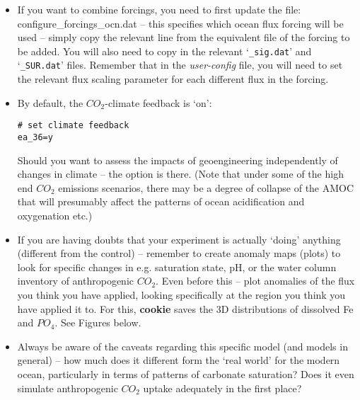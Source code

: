 \begin{itemize}

\vspace{1mm}
\item If you want to combine forcings, you need to first update the file: \textsf{\footnotesize configure\_forcings\_ocn.dat} – this specifies which ocean flux forcing will be used – simply copy the relevant line from the equivalent file of the forcing to be added. You will also need to copy in the relevant ‘\texttt{\_sig.dat}’ and ‘\texttt{\_SUR.dat}’ files. Remember that in the \textit{user-config} file, you will need to set the relevant flux scaling parameter for each different flux in the forcing.

\vspace{1mm}
\item By default, the \(CO_{2}\)-climate feedback is ‘on’:
\vspace{-2pt}\small\begin{verbatim}
# set climate feedback
ea_36=y
\end{verbatim}\normalsize\vspace{-2pt}
Should you want to assess the impacts of geoengineering independently of changes in climate -- the option is there. (Note that under some of the high end \(CO_{2}\) emissions scenarios, there may be a degree of collapse of the AMOC that will presumably affect the patterns of ocean acidification and oxygenation etc.)

\vspace{1mm}
\item If you are having doubts that your experiment is actually ‘doing’ anything (different from the control) – remember to create anomaly maps (plots) to look for specific changes in e.g. saturation state, pH, or the water column inventory of anthropogenic \(CO_{2}\). Even before this – plot anomalies of the flux you think you have applied, looking specifically at the region you think you have applied it to. For this, \textbf{cookie} saves the 3D distributions of dissolved Fe and \(PO_{4}\). See Figures below.

\vspace{1mm}
\item Always be aware of the caveats regarding this specific model (and models in general) – how much does it different form the ‘real world’ for the modern ocean, particularly in terms of patterns of carbonate saturation? Does it even simulate anthropogenic \(CO_{2}\) uptake adequately in the first place?

\end{itemize}

